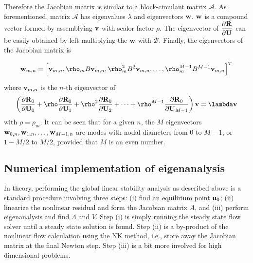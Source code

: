 \documentclass[journal,final]{new-aiaa}
\begin{document}
Therefore the Jacobian matrix is similar to a block-circulant matrix $\mathcal{A}$.
As forementioned, matrix $\mathcal{A}$ has eigenvalues $\lambda$ and eigenvectors
$\mathbf{w}$. $\mathbf{w}$ is a compound vector formed by assemblying
$\mathbf{v}$ with scalor factor $\rho$. The eigenvector of $\dfrac{\partial\mathbf{R}}{\partial\mathbf{U}}$ can be
easily obtained by left multiplying the $\mathbf{w}$ with $\mathcal{B}$.
Finally, the eigenvectors of the Jacobian matrix is


\begin{equation*}
\w_{m,n}=
\left[
\vv_{m,n} ,
\rho_m B \vv_{m,n} ,
\rho_m^2  B^2\vv_{m,n} ,
\dots ,
\rho_m^{M-1} B^{M-1}\vv_{m,n}
\right]^T
\end{equation*}

where $\mathbf{v}_{m,n}$ is the $n$-th eigenvector of 
\begin{equation*}
\left(
\df{\R_0}{\U_0}+ \rho \df{\R_0}{\U_1}+ \rho^2\df{\R_0}{\U_2}  + \cdots + \rho^{M-1} \df{\R_0}{\U_{M-1}}
\right )
 \vv =  \lambda \vv
\end{equation*}
with $\rho=\rho_m$.
{\color{red} It can be seen that for a given $n$, the $M$ eigenvectors $\mathbf{w}_{0,n},\mathbf{w}_{1,n},\dots,\mathbf{w}_{M-1,n}$
are modes with nodal diameters from $0$ to $M-1$, or $1-M/2$ to $M/2$,
provided that $M$ is an even number.}



\subsection{Numerical implementation of eigenanalysis}
In theory, performing the global linear stability analysis as described above
is a standard procedure involving three steps: (i) find an equilirium point $\mathbf{u}_0$;
(ii) linearize the nonlinear residual and form the Jacobian matrix $A$, and
(iii) perform eigenanalysis and find $\Lambda$ and $V$. Step (i) is simply
running the steady state flow solver until a steady state solution
is found. Step (ii) is a by-product of the nonlinear flow calculation using
the NK method, i.e., store away the Jacobian matrix at the final Newton step.
Step (iii) is a bit more involved for high dimensional problems.
\end{document}
